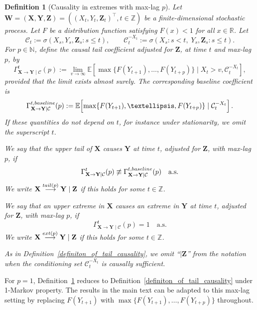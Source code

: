 \documentclass[a4paper,11pt]{article}
\newtheorem{definition}{Definition}
\newcommand{\baseline}{{\rm baseline}}
\begin{document}
\begin{definition}[Causality in extremes with max-lag \(p\)]
\label{definition_CTC_with_lag}
Let \(\mathbf W=(\mathbf X,\mathbf Y,\mathbf Z)=((X_t,Y_t,\mathbf Z_t)^\top,t\in\mathbb Z)\)
be a finite-dimensional stochastic process. Let \(F\) be a distribution function satisfying
\(F(x)<1\) for all \(x\in\mathbb R\). Let
\[
    \mathcal C_t
    :=
    \sigma(X_s,Y_s,\mathbf Z_s:s\le t),
    \qquad
    \mathcal C_t^{-X_t}
    :=
    \sigma(X_s:s<t,\;Y_s,\mathbf Z_s:s\le t).
\]
For \(p\in\mathbb N\), define the causal tail coefficient adjusted for \(\mathbf Z\), at time
\(t\) and max-lag \(p\), by
\[
    \Gamma^t_{\mathbf X\to\mathbf Y\mid\mathcal C}(p)
    :=
    \lim_{v\to\infty}
    \mathbb E\!\left[
        \max\{F(Y_{t+1}),\ldots,F(Y_{t+p})\}
        \mid X_t>v,\mathcal C_t^{-X_t}
    \right],
\]
provided that the limit exists almost surely. The corresponding baseline coefficient is
\[
    \Gamma^{t,\baseline}_{\mathbf X\to\mathbf Y\mid\mathcal C}(p)
    :=
    \mathbb E\!\left[
        \max\{F(Y_{t+1}),\ldots,F(Y_{t+p})\}
        \mid \mathcal C_t^{-X_t}
    \right].
\]
If these quantities do not depend on \(t\), for instance under stationarity, we omit the
superscript \(t\).

We say that the upper tail of \(\mathbf X\) causes \(\mathbf Y\) at time \(t\), adjusted for
\(\mathbf Z\), with max-lag \(p\), if
\[
    \Gamma^t_{\mathbf X\to\mathbf Y\mid\mathcal C}(p)
    \not\equiv
    \Gamma^{t,\baseline}_{\mathbf X\to\mathbf Y\mid\mathcal C}(p)
    \quad \text{a.s.}
\]
We write
\(
    \mathbf X\overset{{\rm tail}(p)}{\longrightarrow}\mathbf Y\mid\mathbf Z
\)
if this holds for some \(t\in\mathbb Z\).

We say that an upper extreme in \(\mathbf X\) causes an extreme in \(\mathbf Y\) at time
\(t\), adjusted for \(\mathbf Z\), with max-lag \(p\), if
\[
    \Gamma^t_{\mathbf X\to\mathbf Y\mid\mathcal C}(p)=1
    \quad \text{a.s.}
\]
We write
\(
    \mathbf X\overset{{\rm ext}(p)}{\longrightarrow}\mathbf Y\mid\mathbf Z
\)
if this holds for some \(t\in\mathbb Z\).

As in Definition~\ref{definiton_of_tail_causality}, we omit ``\(\mid\mathbf Z\)'' from the
notation when the conditioning set \(\mathcal C_t^{-X_t}\) is causally sufficient.
\end{definition}

For \(p=1\), Definition~\ref{definition_CTC_with_lag} reduces to
Definition~\ref{definiton_of_tail_causality} under 1-Markov property. The results in the main text can be adapted to this max-lag setting by replacing \(F(Y_{t+1})\) with \(     \max\{F(Y_{t+1}),\ldots,F(Y_{t+p})\}\) throughout.
\end{document}
